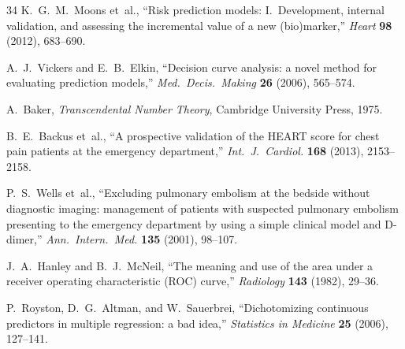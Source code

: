 \documentclass[11pt,a4paper]{article}
\theoremstyle{plain}
\theoremstyle{definition}
\begin{document}
\begin{thebibliography}{34}
K.~G.~M.~Moons et~al., ``Risk prediction models: I.\ Development, internal validation, and assessing the incremental value of a new (bio)marker,'' \emph{Heart} \textbf{98} (2012), 683--690.

A.~J.~Vickers and E.~B.~Elkin, ``Decision curve analysis: a novel method for evaluating prediction models,'' \emph{Med.~Decis.~Making} \textbf{26} (2006), 565--574.

A.~Baker, \emph{Transcendental Number Theory}, Cambridge University Press, 1975.

B.~E.~Backus et~al., ``A prospective validation of the HEART score for chest pain patients at the emergency department,'' \emph{Int.~J.~Cardiol.} \textbf{168} (2013), 2153--2158.

P.~S.~Wells et~al., ``Excluding pulmonary embolism at the bedside without diagnostic imaging: management of patients with suspected pulmonary embolism presenting to the emergency department by using a simple clinical model and D-dimer,'' \emph{Ann.~Intern.~Med.} \textbf{135} (2001), 98--107.

J.~A.~Hanley and B.~J.~McNeil, ``The meaning and use of the area under a receiver operating characteristic (ROC) curve,'' \emph{Radiology} \textbf{143} (1982), 29--36.

P.~Royston, D.~G.~Altman, and W.~Sauerbrei, ``Dichotomizing continuous predictors in multiple regression: a bad idea,'' \emph{Statistics in Medicine} \textbf{25} (2006), 127--141.

\end{thebibliography}
\end{document}

